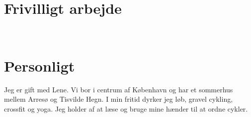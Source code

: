 \documentclass[10pt, a4paper]{article}
\begin{document}
\section{Frivilligt arbejde}
\\[0.2cm]


\section{Personligt}
Jeg er gift med Lene. Vi bor i centrum af København og har et sommerhus mellem Arresø og Tisvilde Hegn. I min fritid dyrker jeg løb, gravel cykling, crossfit og yoga. Jeg holder af at læse og bruge mine hænder til at ordne cykler. 
\end{document}
